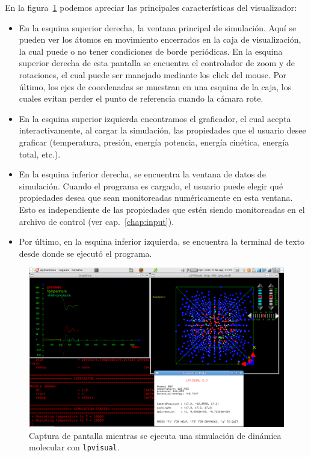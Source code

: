 En la figura~\ref{fig:lpvisual1} podemos apreciar las principales caracter\'isticas del visualizador:
\begin{itemize}
\item En la esquina superior derecha, la ventana principal de simulaci\'on. Aqu\'i se pueden ver los \'atomos en movimiento encerrados en la caja de visualizaci\'on, la cual puede o no tener condiciones de borde peri\'odicas. En la esquina superior derecha de esta pantalla se encuentra el controlador de zoom y de rotaciones, el cual puede ser manejado mediante los click del mouse. Por \'ultimo, los ejes de coordenadas se muestran en una esquina de la caja, los cuales evitan perder el punto de referencia cuando la c\'amara rote.
\item En la esquina superior izquierda encontramos el graficador, el cual acepta interactivamente, al cargar la simulaci\'on, las propiedades que el usuario desee graficar (temperatura, presi\'on, energ\'ia potencia, energ\'ia cin\'etica, energ\'ia total, etc.).
\item En la esquina inferior derecha, se encuentra la ventana de datos de simulaci\'on. Cuando el programa es cargado, el usuario puede elegir qu\'e propiedades desea que sean monitoreadas num\'ericamente en esta ventana. Esto es independiente de las propiedades que est\'en siendo monitoreadas en el archivo de control (ver cap.~\ref{chap:input}).
\item Por \'ultimo, en la esquina inferior izquierda, se encuentra la terminal de texto desde donde se ejecut\'o el programa.
\end{itemize}

\newpage
\begin{figure}[h!]
 \centering
 \includegraphics[width=16cm]{lpvisual1.png}
 \caption{Captura de pantalla mientras se ejecuta una simulaci\'on de din\'amica molecular con {\tt lpvisual}.}
 \label{fig:lpvisual1}
\end{figure}


